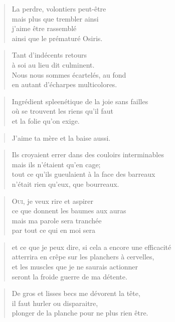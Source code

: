   \begin{verse}
    La perdre, volontiers peut-être\\
    mais plus que trembler ainsi\\
    j’aime être rassemblé\\
    ainsi que le prématuré Osiris.
  \end{verse}
  \begin{verse}
    Tant d’indécents retours\\
    à soi au lieu dit culminent.\\
    Nous nous sommes écartelés, au fond\\
    en autant d’écharpes multicolores.
  \end{verse}
  \begin{verse}
    Ingrédient spleenétique de la joie sans failles\\
    où se trouvent les riens qu’il faut\\
    et la folie qu’on exige.
  \end{verse}
  \begin{verse}
    J’aime ta mère et la baise aussi.
  \end{verse}
  \begin{verse}
    Ils croyaient errer dans des couloirs interminables\\
    mais ils n’étaient qu’en cage;\\
    tout ce qu’ils gueulaient à la face des barreaux\\
    n’était rien qu’eux, que bourreaux.
  \end{verse}
  \begin{verse}
    \textsc{Oui}, je veux rire et aspirer\\
    ce que donnent les baumes aux auras\\
    mais ma parole sera tranchée\\
    par tout ce qui en moi sera
  \end{verse}
  \begin{verse}
    et ce que je peux dire, si cela a encore une efficacité\\
    atterrira en crêpe sur les planchers à cervelles,\\
    et les muscles que je ne saurais actionner\\
    seront la froide guerre de ma détente.
  \end{verse}
  \begin{verse}
    De gros et lisses becs me dévorent la tête,\\
    il faut hurler ou disparaitre,\\
    plonger de la planche pour ne plus rien être.
  \end{verse}
